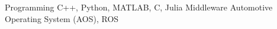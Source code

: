 \begin{samepage}
\nopagebreak

\begin{cvskills}

\cvskill
    {Programming}
    {C++, Python, MATLAB, C, Julia}
\cvskill
    {Middleware}
    {Automotive Operating System (AOS), ROS}

\end{cvskills}

\end{samepage}